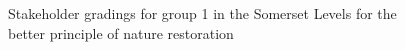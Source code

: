 \documentclass[
  12pt,
  letterpaper,
  DIV=11,
  numbers=noendperiod]{scrartcl}
\begin{document}
\begin{figure}[H]


\caption{\label{fig-SomBetterG1}Stakeholder gradings for group 1 in the
Somerset Levels for the better principle of nature restoration}

\end{figure}%
\end{document}
